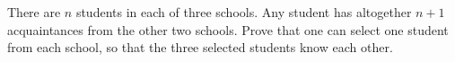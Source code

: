 There are $n$ students in each of three schools. Any student has altogether $n + 1$ acquaintances from the other two schools. Prove that one can select one student from each school, so that the three selected students know each other.
